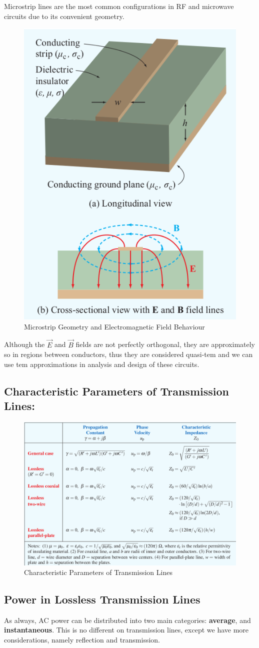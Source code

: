 \documentclass{book}
\begin{document}
Microstrip lines are the most common configurations in RF and microwave circuits due to its convenient geometry. 

\begin{figure}[h]
	\centering
	\includegraphics[width=0.2\linewidth]{Screenshots/microstrip_lines}
	\caption{Microstrip Geometry and Electromagnetic Field Behaviour}
	\label{fig:microstriplines}
\end{figure}

Although the $\vec{E}$ and $\vec{B}$ fields are not perfectly orthogonal, they are approximately so in regions between conductors, thus they are considered quasi-tem and we can use tem approximations in analysis and design of these circuits.


\subsection{Characteristic Parameters of Transmission Lines:}

\begin{figure}[h]
	\centering
	\includegraphics[width=0.4\linewidth]{Screenshots/characteristic_parameters}
	\caption{Characteristic Parameters of Transmission Lines}
	\label{fig:characteristicparameters}
\end{figure}


\subsection{Power in Lossless Transmission Lines}

As always, AC power can be distributed into two main categories: \textbf{average}, and \textbf{instantaneous}. This is no different on transmission lines, except we have more considerations, namely reflection and transmission.
\end{document}
